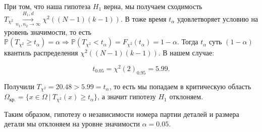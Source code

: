 \documentclass[14pt]{extarticle}
\begin{document}
При том, что наша гипотеза $H_1$ верна, мы получаем сходимость $T_{\chi^2}\overset{H_1, d}{\underset{n_1, n_2\rightarrow\infty}{\longrightarrow}} \chi^2((N-1)(k-1))$. В тоже время $t_{\alpha}$ удовлетворяет условию на уровень значимости, то есть $\mathbb P(T_{\chi^2} \geq t_{\alpha}) = \alpha\Rightarrow \mathbb P(T_{\chi^2} < t_\alpha) = F_{\chi^2} (t_{\alpha}) = 1 - \alpha$. Тогда $t_{\alpha}$ суть $(1-\alpha)$ квантиль распределения $\chi^2((N-1)(k-1))$. В нашем случае:

\begin{equation*}
    t_{0.05} = \chi^2(2)_{0.95} = 5.99.
\end{equation*}

Получили $T_{\chi^2} = 20.48 > 5.99 = t_{\alpha}$, то есть мы попадаем в критическую область $\Omega_{\text{кр.}} = \{x\in\Omega ~|~ T_{\chi^2}(x) \geq t_{\alpha}\}$, а значит гипотезу $H_1$ отклоняем.

Таким образом, гипотезу о независимости номера партии деталей
и размера детали мы отклоняем на уровне значимости $\alpha = 0.05$.
\end{document}
